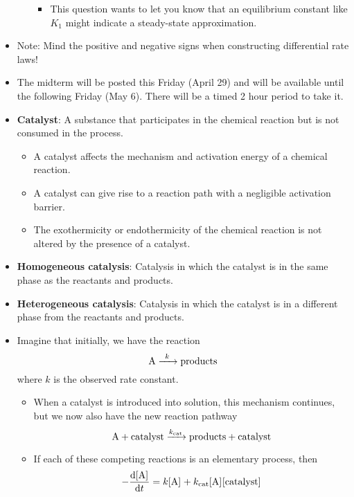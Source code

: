 \documentclass[../notes.tex]{subfiles}
\begin{document}
\begin{itemize}
\begin{itemize}
\begin{itemize}
            \item This question wants to let you know that an equilibrium constant like $K_1$ might indicate a steady-state approximation.
        \end{itemize}
    \end{itemize}
    \item Note: Mind the positive and negative signs when constructing differential rate laws!
    \item The midterm will be posted this Friday (April 29) and will be available until the following Friday (May 6). There will be a timed 2 hour period to take it.
    \item \textbf{Catalyst}: A substance that participates in the chemical reaction but is not consumed in the process.
    \begin{itemize}
        \item A catalyst affects the mechanism and activation energy of a chemical reaction.
        \item A catalyst can give rise to a reaction path with a negligible activation barrier.
        \item The exothermicity or endothermicity of the chemical reaction is not altered by the presence of a catalyst.
    \end{itemize}
    \item \textbf{Homogeneous catalysis}: Catalysis in which the catalyst is in the same phase as the reactants and products.
    \item \textbf{Heterogeneous catalysis}: Catalysis in which the catalyst is in a different phase from the reactants and products.
    \item Imagine that initially, we have the reaction
    \begin{equation*}
        \ce{A ->[$k$] products}
    \end{equation*}
    where $k$ is the observed rate constant.
    \begin{itemize}
        \item When a catalyst is introduced into solution, this mechanism continues, but we now also have the new reaction pathway
        \begin{equation*}
            \ce{A + catalyst ->[$k_\text{cat}$] products + catalyst}
        \end{equation*}
        \item If each of these competing reactions is an elementary process, then
        \begin{equation*}
            -\dv{\cnc{A}}{t} = k\cnc{A}+k_\text{cat}\cnc{A}\cnc{catalyst}

\end{equation*}
\end{itemize}
\end{itemize}
\end{document}
